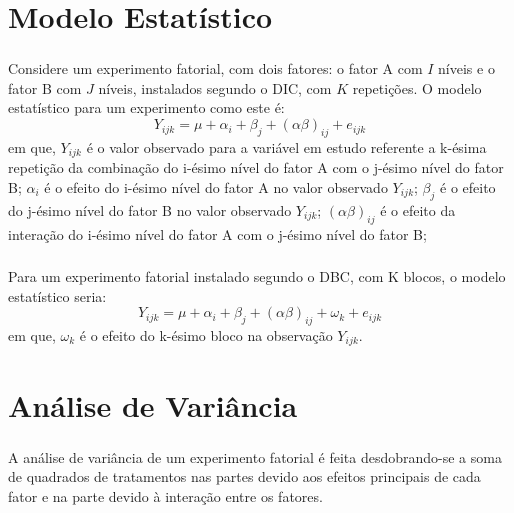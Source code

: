 \documentclass[14pt,aspectratio=1610]{beamer}
\begin{document}
\section{Modelo Estatístico}
\begin{frame}{}
\frametitle{}
\begin{block}{}
\justifying
Considere um experimento fatorial, com dois fatores: o fator A com $I$
níveis e o fator B com $J$ níveis, instalados segundo o DIC, com $K$ repetições. O
modelo estatístico para um experimento como este é:
$$Y_{ijk}=\mu+\alpha_{i}+\beta_{j}+(\alpha\beta)_{ij}+e_{ijk}$$
em que, $Y_{ijk}$ é o valor observado para a variável em estudo referente a k-ésima
repetição da combinação do i-ésimo nível do fator A com o j-ésimo
nível do fator B; $\alpha_{i}$ é o efeito do i-ésimo nível do fator A no valor observado $Y_{ijk}$; $\beta_{j}$ é o efeito do j-ésimo nível do fator B no valor observado $Y_{ijk}$; $(\alpha\beta)_{ij}$ é o efeito da interação do i-ésimo nível do fator A com o j-ésimo nível do fator B;
\end{block}
\end{frame}

\begin{frame}{}
\frametitle{}
\begin{block}{}
\justifying
Para um experimento fatorial instalado segundo o DBC, com K blocos, o
modelo estatístico seria:
$$Y_{ijk}=\mu+\alpha_{i}+\beta_{j}+(\alpha\beta)_{ij}+\omega_{k}+e_{ijk}$$
em que, $\omega_{k}$ é o efeito do k-ésimo bloco na observação $Y_{ijk}.$
\end{block}
\end{frame}

\section{Análise de Variância}
\begin{frame}{}
\frametitle{}
\begin{block}{}
\justifying
A análise de variância de um experimento fatorial é feita desdobrando-se a
soma de quadrados de tratamentos nas partes devido aos efeitos principais de
cada fator e na parte devido à interação entre os fatores.
\end{block}
\end{frame}
\end{document}
